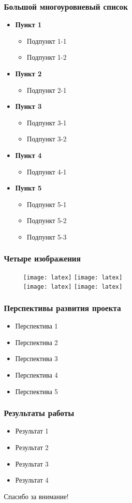 \documentclass[14pt]{beamer}
\newcommand{\itemi}{\item[\checkmark]}
\begin{document}
\begin{frame}
\frametitle{Большой многоуровневый список}
\begin{itemize}
  \item \textbf{Пункт 1}
    \begin{itemize}
      \itemi Подпункт 1-1
      \itemi Подпункт 1-2
    \end{itemize}
  \item \textbf{Пункт 2}
    \begin{itemize}
      \itemi Подпункт 2-1
    \end{itemize}
  \item \textbf{Пункт 3}
    \begin{itemize}
      \itemi Подпункт 3-1
      \itemi Подпункт 3-2
    \end{itemize}
  \item \textbf{Пункт 4}
    \begin{itemize}
      \itemi Подпункт 4-1
    \end{itemize}
  \item \textbf{Пункт 5}
    \begin{itemize}
      \itemi Подпункт 5-1
      \itemi Подпункт 5-2
      \itemi Подпункт 5-3
    \end{itemize}
\end{itemize}
\end{frame}

\begin{frame}
\frametitle{Четыре изображения}
\begin{figure}[H]
  \center
    \texttt{[image: latex]}
    \texttt{[image: latex]}\\
    \texttt{[image: latex]}
    \texttt{[image: latex]}
\end{figure}
\end{frame}

\begin{frame}
\frametitle{Перспективы развития проекта}
\begin{itemize}
  \item Перспектива 1
  \item Перспектива 2
  \item Перспектива 3
  \item Перспектива 4
  \item Перспектива 5
\end{itemize}
\end{frame}

\begin{frame}
\frametitle{Результаты работы}
\begin{itemize}
  \item Результат 1
  \item Результат 2
  \item Результат 3
  \item Результат 4
\end{itemize}
\end{frame}

\begin{frame}
\begin{center}
Спасибо за внимание!
\end{center}
\end{frame}
\end{document}
